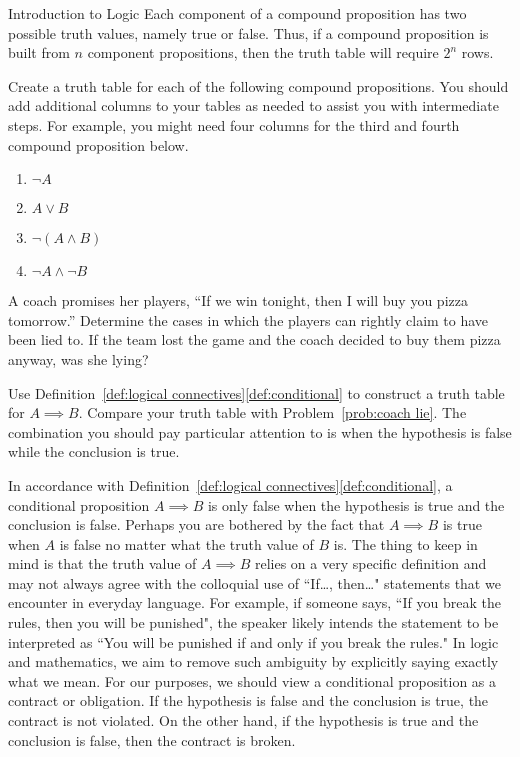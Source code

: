 \begin{section}{Introduction to Logic}
Each component of a compound proposition has two possible truth values, namely true or false. Thus, if a compound proposition is built from $n$ component propositions, then the truth table will require $2^n$ rows.

\begin{problem}
Create a truth table for each of the following compound propositions. You should add additional columns to your tables as needed to assist you with intermediate steps. For example, you might need four columns for the third and fourth compound proposition below.
\begin{enumerate}[label=\textrm{(\alph*)}]
\item $\neg A$
\item $A \vee B$
\item $\neg (A \wedge B)$
\item $\neg A \wedge \neg B$
\end{enumerate}
\end{problem}

\begin{problem}\label{prob:coach lie}
A coach promises her players, ``If we win tonight, then I will buy you pizza tomorrow.''  Determine the cases in which the players can rightly claim to have been lied to. If the team lost the game and the coach decided to buy them pizza anyway, was she lying?
\end{problem}

\begin{problem}
Use Definition~\ref{def:logical connectives}\ref{def:conditional} to construct a truth table for $A \implies B$. Compare your truth table with Problem~\ref{prob:coach lie}. The combination you should pay particular attention to is when the hypothesis is false while the conclusion is true.
\end{problem}

In accordance with Definition~\ref{def:logical connectives}\ref{def:conditional}, a conditional proposition $A\implies B$ is only false when the hypothesis is true and the conclusion is false.  Perhaps you are bothered by the fact that $A\implies B$ is true when $A$ is false no matter what the truth value of $B$ is.  The thing to keep in mind is that the truth value of $A\implies B$ relies on a very specific definition and may not always agree with the colloquial use of ``If\ldots, then\ldots" statements that we encounter in everyday language. For example, if someone says, ``If you break the rules, then you will be punished", the speaker likely intends the statement to be interpreted as ``You will be punished if and only if you break the rules." In logic and mathematics, we aim to remove such ambiguity by explicitly saying exactly what we mean. For our purposes, we should view a conditional proposition as a contract or obligation.  If the hypothesis is false and the conclusion is true, the contract is not violated. On the other hand, if the hypothesis is true and the conclusion is false, then the contract is broken.


\end{section}
